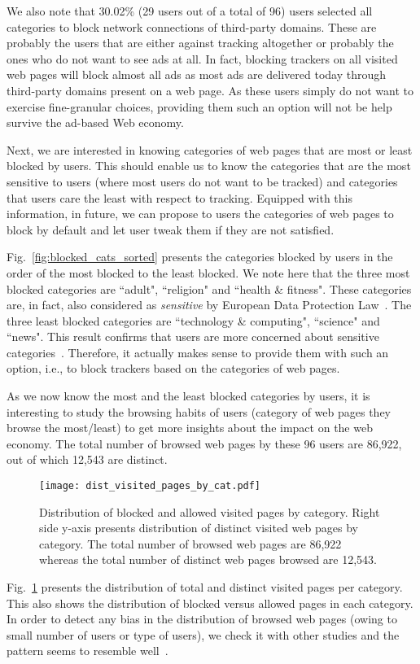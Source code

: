\documentclass[conference]{IEEEtran}
\begin{document}
We also note that 30.02\% (29 users out of a total of 96) users selected all categories to block network connections of third-party domains.
These are probably the users that are either against tracking altogether or probably the ones who do not want to see ads at all.
In fact, blocking trackers on all visited web pages will block almost all ads as most ads are delivered today through third-party domains present on a web page.
As these users simply do not want to exercise fine-granular choices, providing them such an option will not be help survive the ad-based Web economy.

Next, we are interested in knowing categories of web pages that are most or least blocked by users.
This should enable us to know the categories that are the most sensitive to users (where most users do not want to be tracked) and categories that users care the least with respect to tracking.
Equipped with this information, in future, we can propose to users the categories of web pages to block by default and let user tweak them if they are not satisfied.

Fig.~\ref{fig:blocked_cats_sorted} presents the categories blocked by users in the order of the most blocked to the least blocked.
We note here that the three most blocked categories are ``adult", ``religion" and ``health \& fitness".
These categories are, in fact, also considered as \emph{sensitive} by European Data Protection Law~\cite{handbook_data_protection}.
The three least blocked categories are ``technology \& computing", ``science" and ``news".
This result confirms that users are more concerned about sensitive categories~\cite{handbook_data_protection}.
Therefore, it actually makes sense to provide them with such an option, i.e., to block trackers based on the categories of web pages.



As we now know the most and the least blocked categories by users, it is interesting to study the browsing habits of users (category of web pages they browse the most/least) 
to get more insights about the impact on the web economy.
The total number of browsed web pages by these 96 users are 86,922, out of which 12,543 are distinct.
\begin{figure}[t]
\centering
\texttt{[image: dist\_visited\_pages\_by\_cat.pdf]}
\caption{Distribution of blocked and allowed visited pages by category. Right side y-axis presents distribution of distinct visited web pages by category. 
The total number of browsed web pages are 86,922 whereas the total number of distinct web pages browsed are 12,543.}
\label{fig:dist_visited_pages_by_cat}
\end{figure}
Fig.~\ref{fig:dist_visited_pages_by_cat} presents the distribution of total and distinct visited pages per category.
This also shows the distribution of blocked versus allowed pages in each category.
In order to detect any bias in the distribution of browsed web pages (owing to small number of users or type of users), we check it with other studies and the pattern seems to resemble well~\cite{goel2012does, Kumar2010}.
\end{document}
